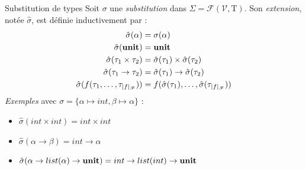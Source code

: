 \documentclass[serif]{beamer}
\newcommand{\exemples}{\textit{Exemples}\xspace}
\newcommand{\unit}{\bold{unit}}
\newcommand{\V}{\mathscr{V}}
\newcommand{\F}{\mathscr{F}}
\newcommand{\T}{\mathrm{T}}
\begin{document}
\begin{frame}{Substitution de types}
\small
Soit $\sigma$ une \emph{substitution} dans $\Sigma = \mathscr{F} (\V, \T)$. Son \emph{extension}, notée $\hat\sigma$, est définie inductivement par :
\begin{align*}
		\hat\sigma (\alpha) &=
		\sigma (\alpha)
	\\
		\hat\sigma (\unit) &=
		\unit
	\\
		\hat\sigma (\tau_1 \times \tau_2) &=
		\hat\sigma (\tau_1) \times \hat\sigma (\tau_2)
	\\
		\hat\sigma (\tau_1 \rightarrow \tau_2) &=
		\hat\sigma (\tau_1) \rightarrow \hat\sigma (\tau_2)
	\\
		\hat\sigma (f (\tau_1, \dots, \tau_{|f|_\F})) &=
		f (\hat\sigma (\tau_1), \dots, \hat\sigma (\tau_{|f|_\F}))
\end{align*}
\exemples avec $\sigma = \{ \alpha \mapsto int, \beta \mapsto \alpha \}$ :
\begin{itemize}
	\item $\hat\sigma (int \times int) = int \times int$
	\item $\hat\sigma (\alpha \rightarrow \beta) = int \rightarrow \alpha$
	\item $\hat\sigma (\alpha \rightarrow list (\alpha) \rightarrow \unit) = int \rightarrow list (int) \rightarrow \unit$
\end{itemize}
\end{frame}

\end{document}
